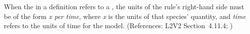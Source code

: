 When the  in a \RateRule definition refers to a \Species,
the units of the rule's right-hand side must be of the form \emph{x per
time}, where \emph{x} is the units of that species' quantity, and
\emph{time} refers to the units of time for the model.  (References: L2V2
Section~4.11.4; )
